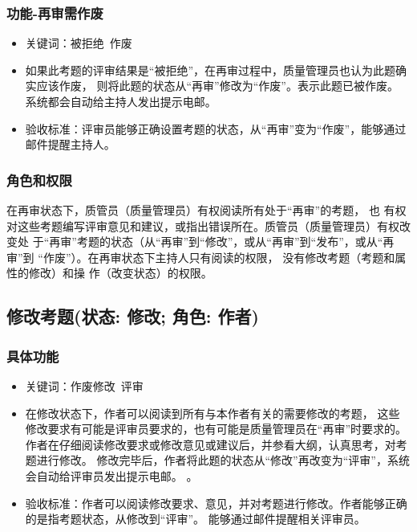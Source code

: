 \documentclass[hyperref, a4paper]{ctexart}
\providecommand{\tightlist}{%
  \setlength{\itemsep}{0pt}\setlength{\parskip}{0pt}}
\begin{document}
\hypertarget{ux529fux80fd-ux518dux5ba1ux9700ux4f5cux5e9f}{%
\subsubsection{功能-再审需作废}\label{ux529fux80fd-ux518dux5ba1ux9700ux4f5cux5e9f}}

\begin{itemize}
\tightlist
\item
  关键词：被拒绝~作废
\item
  如果此考题的评审结果是``被拒绝''，在再审过程中，质量管理员也认为此题确实应该作废，
  则将此题的状态从``再审''修改为``作废''。表示此题已被作废。
  系统都会自动给主持人发出提示电邮。
\item
  验收标准：评审员能够正确设置考题的状态，从``再审''变为``作废''，能够通过邮件提醒主持人。
\end{itemize}

\hypertarget{ux89d2ux8272ux548cux6743ux9650-1}{%
\subsubsection{角色和权限}\label{ux89d2ux8272ux548cux6743ux9650-1}}

在再审状态下，质管员（质量管理员）有权阅读所有处于``再审''的考题， 也
有权对这些考题编写评审意见和建议，或指出错误所在。质管员（质量管理员）有权改变处
于``再审''考题的状态（从``再审''到``修改''，或从``再审''到``发布''，或从``再审''到
``作废''）。在再审状态下主持人只有阅读的权限，
没有修改考题（考题和属性的修改）和操 作（改变状态）的权限。

\hypertarget{ux4feeux6539ux8003ux9898ux72b6ux6001-ux4feeux6539-ux89d2ux8272-ux4f5cux8005}{%
\subsection{修改考题(状态: 修改; 角色:
作者)}\label{ux4feeux6539ux8003ux9898ux72b6ux6001-ux4feeux6539-ux89d2ux8272-ux4f5cux8005}}

\hypertarget{ux5177ux4f53ux529fux80fd}{%
\subsubsection{具体功能}\label{ux5177ux4f53ux529fux80fd}}

\begin{itemize}
\tightlist
\item
  关键词：作废修改~评审
\item
  在修改状态下，作者可以阅读到所有与本作者有关的需要修改的考题，
  这些修改要求有可能是评审员要求的，也有可能是质量管理员在``再审''时要求的。
  作者在仔细阅读修改要求或修改意见或建议后，并参看大纲，认真思考，对考题进行修改。
  修改完毕后，作者将此题的状态从``修改''再改变为``评审''，系统会自动给评审员发出提示电邮。
  。
\item
  验收标准：作者可以阅读修改要求、意见，并对考题进行修改。作者能够正确的是指考题状态，从修改到``评审''。
  能够通过邮件提醒相关评审员。
\end{itemize}
\end{document}
